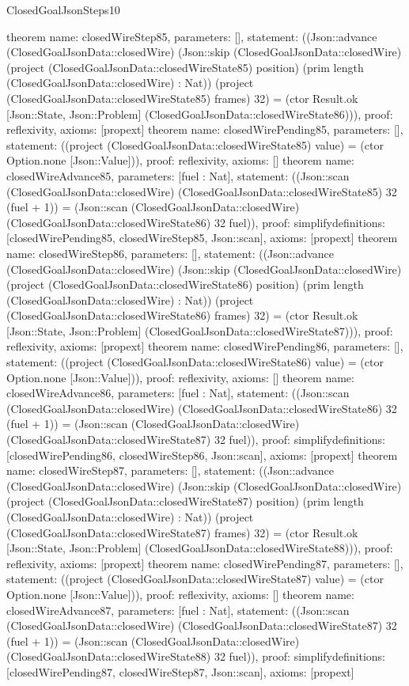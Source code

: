 \begin{lexlean}{ClosedGoalJsonSteps10}
\begin{semanticmodule}
{}
theorem{
 name: closedWireStep85, parameters: [],
 statement: ((Json::advance (ClosedGoalJsonData::closedWire) (Json::skip (ClosedGoalJsonData::closedWire) (project (ClosedGoalJsonData::closedWireState85) position) (prim length (ClosedGoalJsonData::closedWire) : Nat)) (project (ClosedGoalJsonData::closedWireState85) frames) 32) = (ctor Result.ok [Json::State, Json::Problem] (ClosedGoalJsonData::closedWireState86))), proof: reflexivity{}, axioms: [propext]
}
theorem{
 name: closedWirePending85, parameters: [],
 statement: ((project (ClosedGoalJsonData::closedWireState85) value) = (ctor Option.none [Json::Value])), proof: reflexivity{}, axioms: []
}
theorem{
 name: closedWireAdvance85, parameters: [fuel : Nat],
 statement: ((Json::scan (ClosedGoalJsonData::closedWire) (ClosedGoalJsonData::closedWireState85) 32 (fuel + 1)) = (Json::scan (ClosedGoalJsonData::closedWire) (ClosedGoalJsonData::closedWireState86) 32 fuel)), proof: simplify{definitions: [closedWirePending85, closedWireStep85, Json::scan]}, axioms: [propext]
}
theorem{
 name: closedWireStep86, parameters: [],
 statement: ((Json::advance (ClosedGoalJsonData::closedWire) (Json::skip (ClosedGoalJsonData::closedWire) (project (ClosedGoalJsonData::closedWireState86) position) (prim length (ClosedGoalJsonData::closedWire) : Nat)) (project (ClosedGoalJsonData::closedWireState86) frames) 32) = (ctor Result.ok [Json::State, Json::Problem] (ClosedGoalJsonData::closedWireState87))), proof: reflexivity{}, axioms: [propext]
}
theorem{
 name: closedWirePending86, parameters: [],
 statement: ((project (ClosedGoalJsonData::closedWireState86) value) = (ctor Option.none [Json::Value])), proof: reflexivity{}, axioms: []
}
theorem{
 name: closedWireAdvance86, parameters: [fuel : Nat],
 statement: ((Json::scan (ClosedGoalJsonData::closedWire) (ClosedGoalJsonData::closedWireState86) 32 (fuel + 1)) = (Json::scan (ClosedGoalJsonData::closedWire) (ClosedGoalJsonData::closedWireState87) 32 fuel)), proof: simplify{definitions: [closedWirePending86, closedWireStep86, Json::scan]}, axioms: [propext]
}
theorem{
 name: closedWireStep87, parameters: [],
 statement: ((Json::advance (ClosedGoalJsonData::closedWire) (Json::skip (ClosedGoalJsonData::closedWire) (project (ClosedGoalJsonData::closedWireState87) position) (prim length (ClosedGoalJsonData::closedWire) : Nat)) (project (ClosedGoalJsonData::closedWireState87) frames) 32) = (ctor Result.ok [Json::State, Json::Problem] (ClosedGoalJsonData::closedWireState88))), proof: reflexivity{}, axioms: [propext]
}
theorem{
 name: closedWirePending87, parameters: [],
 statement: ((project (ClosedGoalJsonData::closedWireState87) value) = (ctor Option.none [Json::Value])), proof: reflexivity{}, axioms: []
}
theorem{
 name: closedWireAdvance87, parameters: [fuel : Nat],
 statement: ((Json::scan (ClosedGoalJsonData::closedWire) (ClosedGoalJsonData::closedWireState87) 32 (fuel + 1)) = (Json::scan (ClosedGoalJsonData::closedWire) (ClosedGoalJsonData::closedWireState88) 32 fuel)), proof: simplify{definitions: [closedWirePending87, closedWireStep87, Json::scan]}, axioms: [propext]
}
\end{semanticmodule}
\end{lexlean}

